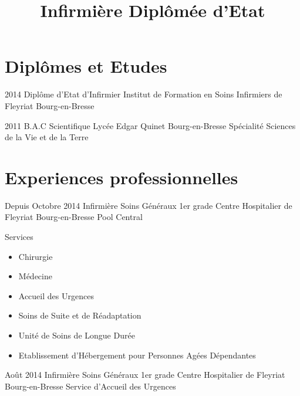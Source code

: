 \documentclass[10pt,a4paper]{moderncv}
\title{Infirmière Diplômée d'Etat}
\begin{document}
\maketitle
\pagestyle{empty}


\section{Diplômes et Etudes}

\cventry
	{2014}
	{Diplôme d'Etat d'Infirmier}
	{Institut de Formation en Soins Infirmiers de Fleyriat}
	{Bourg-en-Bresse}
	{}
	{}

\cventry
	{2011}
	{B.A.C Scientifique}
	{Lycée Edgar Quinet}
	{Bourg-en-Bresse}
	{}
	{Spécialité Sciences de la Vie et de la Terre}



\section{Experiences professionnelles}

\cventry
	{Depuis Octobre 2014}
	{Infirmière Soins Généraux 1er grade}
	{Centre Hospitalier de Fleyriat}
	{Bourg-en-Bresse}
	{}
	{Pool Central}

\cventry
	{}
	{Services}
	{}
	{}
	{}
	{
		\begin{itemize}
			\item Chirurgie
			\item Médecine
			\item Accueil des Urgences
			\item Soins de Suite et de Réadaptation
			\item Unité de Soins de Longue Durée
			\item Etablissement d'Hébergement pour Personnes Agées Dépendantes
		\end{itemize}
	}

\vspace*{3mm}

\cventry
	{Août 2014}
	{Infirmière Soins Généraux 1er grade}
	{Centre Hospitalier de Fleyriat}
	{Bourg-en-Bresse}
	{}
	{Service d'Accueil des Urgences}
\end{document}
